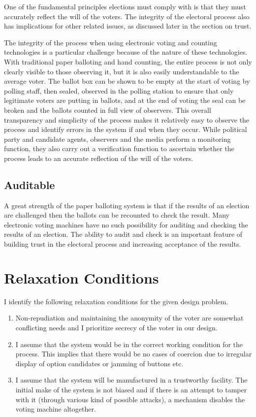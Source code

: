 \documentclass{article}
\begin{document}
One of the fundamental principles elections must comply with is that they must accurately reflect the will of the voters. The integrity of the electoral process also has implications for other related issues, as discussed later in the section on trust.\par
The integrity of the process when using electronic voting and counting technologies is a particular challenge because of the nature of these technologies. With traditional paper balloting and hand counting, the entire process is not only clearly visible to those observing it, but it is also easily understandable to the average voter. The ballot box can be shown to be empty at the start of voting by polling staff, then sealed, observed in the polling station to ensure that only legitimate voters are putting in ballots, and at the end of voting the seal can be broken and the ballots counted in full view of observers. This overall transparency and simplicity of the process makes it relatively easy to observe the process and identify errors in the system if and when they occur. While political party and candidate agents, observers and the media perform a monitoring function, they also carry out a verification function to ascertain whether the process leads to an accurate reflection of the will of the voters.

\subsection{Auditable}
A great strength of the paper balloting system is that if the results of an election are challenged then the ballots can be recounted to check the result. Many electronic voting machines have no such possibility for auditing and checking the results of an election. The ability to audit and check is an important feature of building trust in the electoral process and increasing acceptance of the results.

\section{Relaxation Conditions}

I identify the following relaxation conditions for the given design problem.
\begin{enumerate}  
\item Non-repudiation and maintaining the anonymity of the voter are somewhat conflicting needs and I prioritize secrecy of the voter in our design.
\item I assume that the system would be in the correct working condition for the process. This implies that there would be no cases of coercion due to irregular display of option candidates or jamming of buttons etc.
\item I assume that the system will be manufactured in a trustworthy facility. The initial make of the system is not biased and if there is an attempt to tamper with it (through various kind of possible attacks), a mechanism disables the voting machine altogether.
\end{enumerate}
\end{document}

